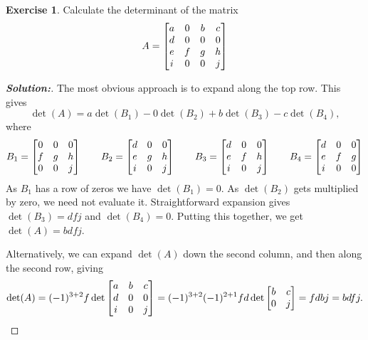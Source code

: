 \documentclass[a4paper]{amsart}
\theoremstyle{definition}
\newtheorem{exercise}{Exercise}
\newenvironment{solution}{\begin{proof}[\textbf{Solution:}] \vphantom{u}}{\end{proof}}
\begin{document}
\begin{exercise}\label{ex-det-i}
 Calculate the determinant of the matrix
 \[ A = 
     \left[\begin{matrix} 
      a & 0 & b & c \\
      d & 0 & 0 & 0 \\
      e & f & g & h \\
      i & 0 & 0 & j 
     \end{matrix}\right]
 \]
\end{exercise}
\begin{solution}
 The most obvious approach is to expand along the top row.  This gives 
 \[ \det(A) = a\det(B_1) - 0\det(B_2) + b\det(B_3) - c\det(B_4), \]
 where 
 \[ 
  B_1 = \left[\begin{matrix} 0&0&0 \\ f&g&h \\ 0&0&j \end{matrix}\right] \qquad
  B_2 = \left[\begin{matrix} d&0&0 \\ e&g&h \\ i&0&j \end{matrix}\right] \qquad
  B_3 = \left[\begin{matrix} d&0&0 \\ e&f&h \\ i&0&j \end{matrix}\right] \qquad
  B_4 = \left[\begin{matrix} d&0&0 \\ e&f&g \\ i&0&0 \end{matrix}\right]
 \]
 As $B_1$ has a row of zeros we have $\det(B_1)=0$.  As $\det(B_2)$
 gets multiplied by zero, we need not evaluate it.  Straightforward
 expansion gives $\det(B_3)=dfj$ and $\det(B_4)=0$.  Putting this
 together, we get $\det(A)=bdfj$.

 Alternatively, we can expand $\det(A)$ down the second column, and
 then along the second row, giving 
 \[ 
  \det(A) = (-1)^{3+2}f \det\left[\begin{matrix} a&b&c \\ d&0&0 \\ i&0&j \end{matrix}\right] 
    = (-1)^{3+2} (-1)^{2+1} fd\det\left[\begin{matrix} b&c \\ 0&j\end{matrix}\right] 
    = fdbj = bdfj.
 \]
\end{solution}
\end{document}
